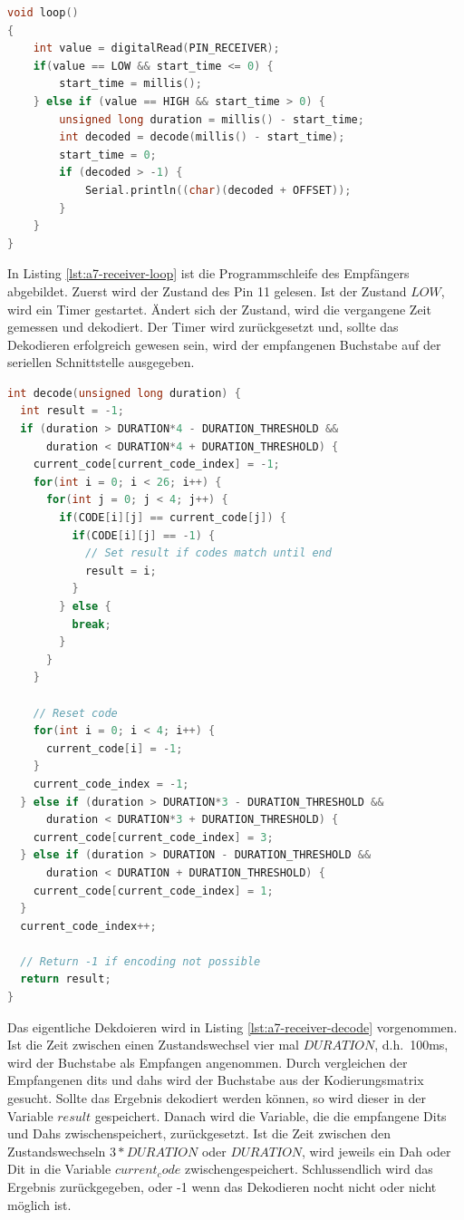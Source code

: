 \begin{lstlisting}[language=C,label={lst:a7-receiver-loop}, caption={Programmschleife des Empfängers}]
void loop()
{
    int value = digitalRead(PIN_RECEIVER);
    if(value == LOW && start_time <= 0) {
        start_time = millis();
    } else if (value == HIGH && start_time > 0) {
        unsigned long duration = millis() - start_time;
        int decoded = decode(millis() - start_time);
        start_time = 0;
        if (decoded > -1) {
            Serial.println((char)(decoded + OFFSET));
        }
    }
}
\end{lstlisting}

In Listing \ref{lst:a7-receiver-loop} ist die Programmschleife des Empfängers abgebildet.
Zuerst wird der Zustand des Pin 11 gelesen.
Ist der Zustand $LOW$, wird ein Timer gestartet.
Ändert sich der Zustand, wird die vergangene Zeit gemessen und dekodiert.
Der Timer wird zurückgesetzt und, sollte das Dekodieren erfolgreich gewesen sein, wird der empfangenen Buchstabe auf der seriellen Schnittstelle ausgegeben.

\begin{lstlisting}[language=C,label={lst:a7-receiver-decode}, caption={Dekodieren empfangenen Daten}]
int decode(unsigned long duration) {
  int result = -1;
  if (duration > DURATION*4 - DURATION_THRESHOLD &&
      duration < DURATION*4 + DURATION_THRESHOLD) {
    current_code[current_code_index] = -1;
    for(int i = 0; i < 26; i++) {
      for(int j = 0; j < 4; j++) {
        if(CODE[i][j] == current_code[j]) {
          if(CODE[i][j] == -1) {
            // Set result if codes match until end
            result = i;
          }
        } else {
          break;
        }
      }
    }

    // Reset code
    for(int i = 0; i < 4; i++) {
      current_code[i] = -1;
    }
    current_code_index = -1;
  } else if (duration > DURATION*3 - DURATION_THRESHOLD &&
      duration < DURATION*3 + DURATION_THRESHOLD) {
    current_code[current_code_index] = 3;
  } else if (duration > DURATION - DURATION_THRESHOLD &&
      duration < DURATION + DURATION_THRESHOLD) {
    current_code[current_code_index] = 1;
  }
  current_code_index++;

  // Return -1 if encoding not possible
  return result;
}
\end{lstlisting}

Das eigentliche Dekdoieren wird in Listing \ref{lst:a7-receiver-decode} vorgenommen.
Ist die Zeit zwischen einen Zustandswechsel vier mal $DURATION$, d.h.\ 100ms, wird der Buchstabe als Empfangen angenommen.
Durch vergleichen der Empfangenen dits und dahs wird der Buchstabe aus der Kodierungsmatrix gesucht.
Sollte das Ergebnis dekodiert werden können, so wird dieser in der Variable $result$ gespeichert.
Danach wird die Variable, die die empfangene Dits und Dahs zwischenspeichert, zurückgesetzt.
Ist die Zeit zwischen den Zustandswechseln $3*DURATION$ oder $DURATION$, wird jeweils ein Dah oder Dit in die Variable $current_code$ zwischengespeichert.
Schlussendlich wird das Ergebnis zurückgegeben, oder -1 wenn das Dekodieren nocht nicht oder nicht möglich ist.

